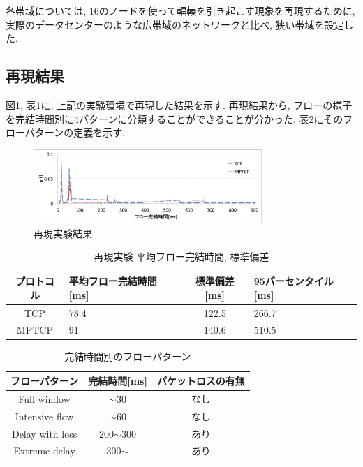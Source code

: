 各帯域については, 16のノードを使って輻輳を引き起こす現象を再現するために, 実際のデータセンターのような広帯域のネットワークと比べ,
狭い帯域を設定した.

\subsection{再現結果}
図\ref{fig:short_flow_rep}, 表\ref{table:short_flow_rep}に, 上記の実験環境で再現した結果を示す.
再現結果から, フローの様子を完結時間別に4パターンに分類することができることが分かった.
表\ref{table:flow_pattern}にそのフローパターンの定義を示す.

\begin{figure}[t]
    \begin{center}
    \includegraphics[autoebb, width=245pt]{./img/flow_comp.pdf}
    \caption{再現実験結果}
    \label{fig:short_flow_rep}
    \end{center}
\end{figure}

\begin{table}[t]
\begin{center}
\begin{tabular}{c|p{6em}|c|p{6em}}
\hline
プロトコル & 平均フロー完結時間[ms] & 標準偏差[ms] &
95パーセンタイル[ms] \\
\hline \hline TCP &\hfil 78.4 & 122.5 &\hfil 266.7\\
MPTCP &\hfil 91 & 140.6 &\hfil 510.5\\
\hline
\end{tabular}
\caption{再現実験-平均フロー完結時間, 標準偏差}
\label{table:short_flow_rep}
\end{center}
\end{table}

\begin{table}[t]
\begin{center}
\begin{tabular}{c|c|c}
\hline
フローパターン & 完結時間[ms] & パケットロスの有無 \\ \hline \hline
Full window & $\sim$30 & なし\\
Intensive flow & $\sim$60 & なし\\
Delay with loss & 200$\sim$300 & あり\\
Extreme delay & 300$\sim$ & あり\\
\hline
\end{tabular}
\caption{完結時間別のフローパターン}
\label{table:flow_pattern}
\end{center}
\end{table}


